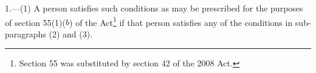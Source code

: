 \documentclass[12pt,a4paper]{article}
\begin{document}
%
%
%
%
%

%
%

1.---(1)   A person satisfies such conditions as may be prescribed for the purposes of section 55(1)($b$) of the Act\footnote{Section 55 was substituted by section 42 of the 2008 Act.} if that person satisfies any of the conditions in sub-paragraphs (2) and (3).
\end{document}
